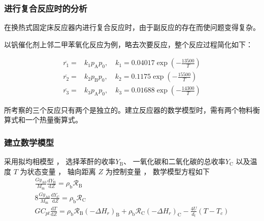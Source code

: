 \begin{frame}
    \frametitle{进行复合反应时的分析}

    在换热式固定床反应器内进行复合反应时，由于副反应的存在而使问题变得复杂。

    以钒催化剂上邻二甲苯氧化反应为例，略去次要反应，整个反应过程简化如下：

    \begin{minipage}{0.48\linewidth}
        \begin{center}
            \end{center}
    \end{minipage}\hfill
    \begin{minipage}{0.48\linewidth}
        \[
            \begin{aligned}
                \overline{r_1}=&k_1p_\text{A}p_0,\quad k_1=0.04017\exp\left(-\frac{13500}{T}\right)\\
                \overline{r_2}=&k_2p_\text{B}p_0,\quad k_2=0.1175\exp\left(-\frac{15500}{T}\right)\\
                \overline{r_3}=&k_3p_\text{A}p_0,\quad k_3=0.01688\exp\left(-\frac{14300}{T}\right)
            \end{aligned}
        \]
    \end{minipage}
    
    所考察的三个反应只有两个是独立的。建立反应器的数学模型时，需有两个物料衡算式和一个热量衡算式。

\end{frame}


\begin{frame}
    \frametitle{建立数学模型}
    采用拟均相模型 ， 选择苯酐的收率$Y_\mathrm{B}$、 一氧化碳和二氧化碳的总收率$Y_\mathrm{C}$ 以及温度 $T$ 为状态变量 ， 轴向距离 $Z$ 为控制变量 ， 数学模型方程如下
    $$\begin{gathered}
        \frac{Gy_{\mathrm{A}0}}{M_{\mathrm{m}}}\frac{\mathrm{d}Y_{\mathrm{B}}}{\mathrm{d}Z}=\rho_{\mathrm{b}}\mathscr{R}_{\mathrm{B}} \\
        8\frac{Gy_{\mathrm{A}0}}{M_{\mathrm{m}}}\frac{\mathrm{d}Y_{\mathrm{C}}}{\mathrm{d}Z}=\rho_{\mathrm{b}}{\mathscr{R}}_{\mathrm{C}} \\
        GC_{pt}{\frac{\mathrm{d}T}{\mathrm{d}Z}}=\rho_{\mathrm{b}}\mathscr{R}_{\mathrm{B}}(-\Delta H_{r})_{\mathrm{B}}+\rho_{\mathrm{b}}\mathscr{R}_{\mathrm{C}}(-\Delta H_{r})_{\mathrm{C}}-{\frac{4U}{d_{t}}}(T-T_{c}) 
    \end{gathered}$$
\end{frame}


